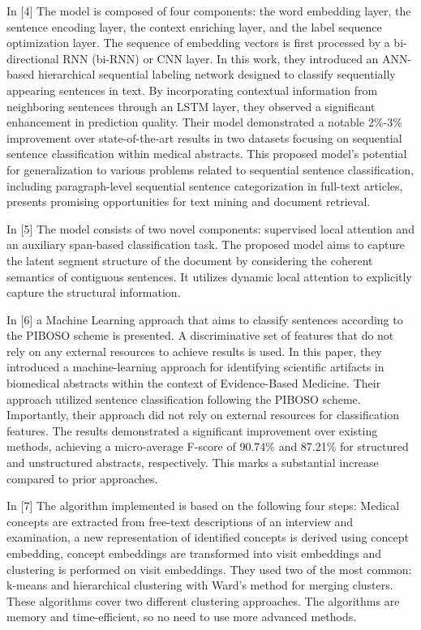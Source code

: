 \documentclass[12pt,a4paper]{report}     %
\begin{document}
\begin{normalsize}
{In [4] The model is composed of four components: the word embedding layer, the sentence encoding layer, the context enriching layer, and the label sequence optimization layer. The sequence of embedding vectors is first processed by a bi-directional RNN (bi-RNN) or CNN layer. In this work, they introduced an ANN-based hierarchical sequential labeling network designed to classify sequentially appearing sentences in text. By incorporating contextual information from neighboring sentences through an LSTM layer, they observed a significant enhancement in prediction quality. Their model demonstrated a notable 2\%-3\% improvement over state-of-the-art results in two datasets focusing on sequential sentence classification within medical abstracts. This proposed model's potential for generalization to various problems related to sequential sentence classification, including paragraph-level sequential sentence categorization in full-text articles, presents promising opportunities for text mining and document retrieval.

In [5] The model consists of two novel components: supervised local attention and an auxiliary span-based classification task. The proposed model aims to capture the latent segment structure of the document by considering the coherent semantics of contiguous sentences. It utilizes dynamic local attention to explicitly capture the structural information. 

In [6] a Machine Learning approach that aims to classify sentences according to the PIBOSO scheme is presented. A discriminative set of features that do not rely on any external resources to achieve results is used. In this paper, they introduced a machine-learning approach for identifying scientific artifacts in biomedical abstracts within the context of Evidence-Based Medicine. Their approach utilized sentence classification following the PIBOSO scheme. Importantly, their approach did not rely on external resources for classification features. The results demonstrated a significant improvement over existing methods, achieving a micro-average F-score of 90.74\% and 87.21\% for structured and unstructured abstracts, respectively. This marks a substantial increase compared to prior approaches.

In [7] The algorithm implemented is based on the following four steps:  Medical concepts are extracted from free-text descriptions of an interview and examination, a new representation of identified concepts is derived using concept embedding, concept embeddings are transformed into visit embeddings and clustering is performed on visit embeddings. They used two of the most common: k-means and hierarchical clustering with Ward’s method for merging clusters.  These algorithms cover two different clustering approaches. The algorithms are memory and time-efficient, so no need to use more advanced methods. 

}
\end{normalsize}
\end{document}
